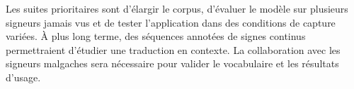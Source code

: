 \begin{conclusion}
Les suites prioritaires sont d'élargir le corpus, d'évaluer le modèle sur plusieurs signeurs jamais vus et de tester l'application dans des conditions de capture variées. À plus long terme, des séquences annotées de signes continus permettraient d'étudier une traduction en contexte. La collaboration avec les signeurs malgaches sera nécessaire pour valider le vocabulaire et les résultats d'usage.

\end{conclusion}
